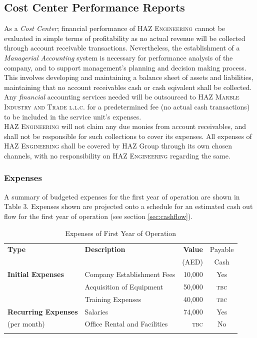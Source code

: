 \documentclass[a4paper,oneside,12pt,final]{article}
\begin{document}
\subsection{Cost Center Performance Reports}
As a \emph{Cost Center}; financial performance of \textsc{HAZ Engineering} cannot be evaluated in simple terms of profitability as no actual revenue will be collected through account receivable transactions. Nevertheless, the establishment of a \emph{Managerial Accounting} system is necessary for performance analysis of the company, and to support management's planning and decision making process. This involves developing and maintaining a balance sheet of assets and liabilities, maintaining that no account receivables cash or cash eqivalent shall be collected.\\

Any \emph{financial} accounting services needed will be outsourced to \textsc{HAZ Marble Industry and Trade l.l.c.} for a predetermined fee (no actual cash transactions) to be included in the service unit's expenses.\\

\textsc{HAZ Engineering} will not claim any due monies from account receivables, and shall not be responsible for such collections to cover its expenses. All expenses of \textsc{HAZ Engineering} shall be covered by HAZ Group through its own chosen channels, with no responsibility on \textsc{HAZ Engineering} regarding the same.

\subsubsection{Expenses}
A summary of budgeted expenses for the first year of operation are shown in Table 3. Expenses shown are projected onto a schedule for an estimated cash out flow for the first year of operation (see section \ref{sec:cashflow}).

\begin{table}[h]
	\centering
	\begin{tabular}{p{4.1cm}p{5.5cm}rc}
	\toprule
	\textbf{Type}&\textbf{Description}&\textbf{Value}&Payable\\
	&&(AED)&Cash \vspace{0.2cm}\\ 
	\midrule
	\normalsize
	\textbf{Initial Expenses}&Company Establishment Fees&10,000&Yes\\
	&Acquisition of Equipment&50,000&\textsc{tbc}\\
	&Training Expenses&40,000&\textsc{tbc}\vspace{0.3cm}\\
	\textbf{Recurring Expenses}&Salaries&74,000&Yes\\
	\small (per month)\normalsize&Office Rental and Facilities&\textsc{tbc}&No\\
	\bottomrule
	\label{tab:expenses}
	\end{tabular}\vspace{-0.5cm}
	\caption{Expenses of First Year of Operation}
\end{table}
\end{document}
